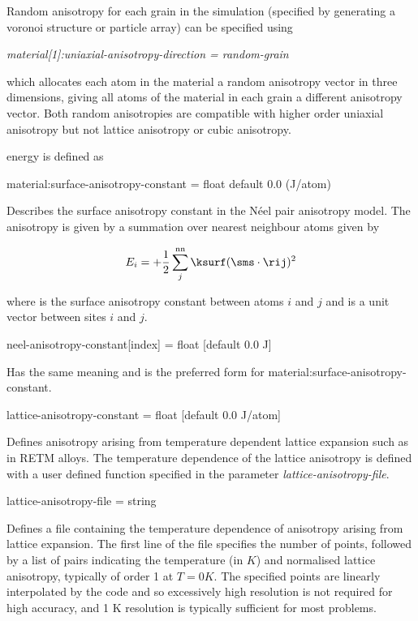 Random anisotropy for each grain in the simulation (specified by generating a
voronoi structure or particle array) can be specified using

\textit{material[1]:uniaxial-anisotropy-direction = random-grain}

which allocates each atom in the material a random anisotropy vector in three
dimensions, giving all atoms of the material in each grain a different
anisotropy vector. Both random anisotropies are compatible with higher order
uniaxial anisotropy but not lattice anisotropy or cubic anisotropy.


energy is defined as

{\zicf material:surface-anisotropy-constant = float default 0.0 (J/atom)}
Describes the surface anisotropy constant in the N\'eel pair anisotropy model.
The anisotropy is given by a summation over nearest neighbour atoms given by

\begin{equation*}
E_i = +\frac{1}{2} \sum_j^{\mathrm{nn}} \ksurf (\sms \cdot \rij )^2
\end{equation*}

\noindent where \ksurf is the surface anisotropy constant between atoms $i$ and
$j$ and \rij is a unit vector between sites $i$ and $j$.

{\zicf neel-anisotropy-constant[index] = float [default 0.0 J]}
Has the same meaning and is the preferred form for
material:surface-anisotropy-constant.

{\zicf lattice-anisotropy-constant = float [default 0.0 J/atom]}
Defines anisotropy arising from temperature dependent lattice expansion such
as in RETM alloys. The temperature dependence of the lattice anisotropy is
defined with a user defined function specified in the parameter
\textit{lattice-anisotropy-file}.

{\zicf lattice-anisotropy-file = string}
Defines a file containing the temperature dependence of anisotropy arising from
lattice expansion. The first line of the file specifies the number of points,
followed by a list of pairs indicating the temperature (in $K$) and normalised
lattice anisotropy, typically of order 1 at $T = 0 K$. The specified points are
linearly interpolated by the code and so excessively high resolution is not
required for high accuracy, and 1 K resolution is typically sufficient for most
problems.

